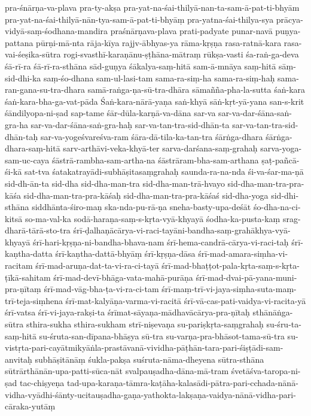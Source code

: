 {{pra-śnārṇa-va-plava
pra-ty-akṣa
pra-yat-na-śai-thilyā-nan-ta-sam-ā-pat-ti-bhyām
pra-yat-na-śai-thilyā-nān-tya-sam-ā-pat-ti-bhyāṃ
pra-yatna-śai-thilya-sya
prācya-vidyā-saṃ-śodhana-mandira
praśnārṇava-plava
prati-padyate
punar-navā
puṇya-pattana
pūrṇi-mā-nta
rāja-kīya
rajjv-ābhyas-ya
rāma-kṛṣṇa
rasa-ratnā-kara
rasa-vai-śeṣika-sūtra
rogi-svasthī-karaṇānu-ṣṭhāna-mātraṃ
rūkṣa-vasti
śa-raṅ-ga-deva
śā-rī-ra
śā-rī-ra-sthāna
sād-guṇya
śākalya-saṃ-hitā
sam-ā-mnāya
saṃ-hitā
sāṃ-sid-dhi-ka
saṃ-śo-dhana
sam-ul-lasi-tam
sama-ra-siṃ-ha
sama-ra-siṃ-haḥ
sama-ran-gana-su-tra-dhara
samā-raṅga-ṇa-sū-tra-dhāra
sāmañña-pha-la-sutta
śaṅ-kara
śaṅ-kara-bha-ga-vat-pāda
Śaṅ-kara-nārā-yaṇa
saṅ-khyā
sāṅ-kṛt-yā-yana
san-s-krit
śāndilyopa-ni-ṣad
sap-tame
śār-dūla-karṇā-va-dāna
sar-va
sar-va-dar-śāna-saṅ-gra-ha
sar-va-dar-śāna-saṅ-gra-haḥ
sar-va-tan-tra-sid-dhān-ta
sar-va-tan-tra-sid-dhān-taḥ
sar-va-yogeśvareśva-ram
śāra-dā-tila-ka-tan-tra
śārṅga-dhara
śārṅga-dhara-saṃ-hitā
sarv-arthāvi-veka-khyā-ter
sarva-darśana-saṃ-grahaḥ
sarva-yoga-sam-uc-caya
śāstrā-rambha-sam-artha-na
śāstrāram-bha-sam-arthana
ṣaṭ-pañcā-śi-kā
sat-tva
śatakatrayādi-subhāṣitasaṃgrahaḥ
saunda-ra-na-nda
śi-va-śar-ma-ṇā
sid-dh-ān-ta
sid-dha
sid-dha-man-tra
sid-dha-man-trā-hvayo
sid-dha-man-tra-pra-kāśa
sid-dha-man-tra-pra-kāśaḥ
sid-dha-man-tra-pra-kāśaś
sid-dha-yoga
sid-dhi-sthāna
siddhānta-śiro-maṇ
ska-nda-pu-rā-ṇa
sneha-basty-upa-deśāt
śo-dha-na-ci-kitsā
so-ma-val-ka
sodā-haraṇa-saṃ-s-kṛta-vyā-khyayā
śodha-ka-pusta-kaṃ
srag-dharā-tārā-sto-tra
śrī-ḍalhaṇācārya-vi-raci-tayāni-bandha-saṃ-grahākhya-vyā-khyayā
śrī-hari-kṛṣṇa-ni-bandha-bhava-nam
śrī-hema-candrā-cārya-vi-raci-taḥ
śrī-kaṇtha-datta
śrī-kaṇtha-dattā-bhyāṃ
śrī-kṛṣṇa-dāsa
śrī-mad-amara-siṃha-vi-racitam
śrī-mad-aruṇa-dat-ta-vi-ra-ci-tayā
śrī-mad-bhaṭṭot-pala-kṛta-saṃ-s-kṛta-ṭīkā-sahitam
śrī-mad-devī-bhāga-vata-mahā-purāṇa
śrī-mad-dvai-pā-yana-muni-pra-ṇītaṃ
śrī-mad-vāg-bha-ṭa-vi-ra-ci-tam
śrī-maṃ-trī-vi-jaya-siṃha-suta-maṃ-trī-teja-siṃhena
śrī-mat-kalyāṇa-varma-vi-racitā
śrī-vā-cas-pati-vaidya-vi-racita-yā
śrī-vatsa
śrī-vi-jaya-rakṣi-ta
śrīmat-sāyaṇa-mādhavācārya-pra-ṇītaḥ
sthānāṅga-sūtra
sthira-sukha
sthira-sukham
strī-niṣevaṇa
su-pariṣkṛta-saṃgrahaḥ
su-śru-ta-saṃ-hitā
su-śruta-san-dīpana-bhāṣya
sū-tra
su-varṇa-pra-bhāsot-tama-sū-tra
su-vistṛta-pari-cayātmikyāṅla-prastāvanā-vividha-pāṭhān-tara-pari-śiṣṭādi-sam-anvitaḥ
subhāṣitānāṃ
śukla-pakṣa
suśruta-nāma-dheyena
sūtra-sthāna
sūtrārthānān-upa-patti-sūca-nāt
svalpauṣadha-dāna-mā-tram
śvetāśva-taropa-ni-ṣad
tac-chiṣyeṇa
tad-upa-karaṇa-tāmra-kaṭāha-kalasādi-pātra-pari-cchada-nānā-vidha-vyādhi-śānty-ucitauṣadha-gaṇa-yathokta-lakṣaṇa-vaidya-nānā-vidha-pari-cāraka-yutāṃ
}}
